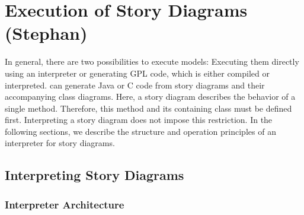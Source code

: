 \chapter{Execution of Story Diagrams (Stephan)} \label{sec:Execution}

In general, there are two possibilities to execute models: Executing them directly using an interpreter \cite{GHS09} or generating GPL code, which is either compiled or interpreted. 
\fuj can generate Java or C code from story diagrams and their accompanying class diagrams. 
Here, a story diagram describes the behavior of a single method. 
Therefore, this method and its containing class must be defined first. 
Interpreting a story diagram does not impose this restriction.
In the following sections, we describe the structure and operation principles of an interpreter for story diagrams.


\section{Interpreting Story Diagrams}
\label{sec:InterpretingStoryDiagrams}

\subsection{Interpreter Architecture}

